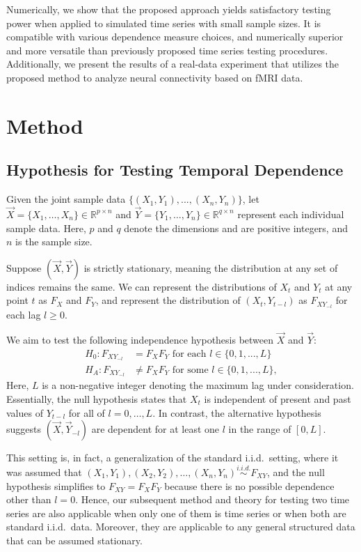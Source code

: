 Numerically, we show that the proposed approach yields satisfactory testing power when applied to simulated time series with small sample sizes. It is compatible with various dependence measure choices, and numerically superior and more versatile than previously proposed time series testing procedures. Additionally, we present the results of a real-data experiment that utilizes the proposed method to analyze neural connectivity based on fMRI data. 

\section{Method}

\subsection{Hypothesis for Testing Temporal Dependence}
Given the joint sample data $\{(X_1,Y_1),...,(X_n,Y_n)\}$, let $\vec{X}=\{X_1, \ldots, X_n\} \in \mathbb{R}^{p \times n}$ and $\vec{Y}=\{Y_1, \ldots, Y_n\} \in \mathbb{R}^{q \times n}$ represent each individual sample data. Here, $p$ and $q$ denote the dimensions and are positive integers, and $n$ is the sample size.

Suppose $(\vec{X},\vec{Y})$ is strictly stationary, meaning the distribution at any set of indices remains the same. We can represent the distributions of $X_t$ and $Y_t$ at any point $t$ as $F_{X}$ and $F_{Y}$, and represent the distribution of $(X_{t}, Y_{t-l})$ as $F_{XY_{-l}}$ for each lag $l \geq 0$.

We aim to test the following independence hypothesis between $\vec{X}$ and $\vec{Y}$:
\begin{align*}
    H_0: F_{XY_{-l}} &= F_{X} F_{Y} \text{ for each } l \in \{0, 1, ..., L\}\\
    H_A: F_{XY_{-l}} &\neq F_{X} F_{Y} \text{ for some } l \in \{0, 1, ..., L\},
\end{align*}
Here, $L$ is a non-negative integer denoting the maximum lag under consideration. Essentially, the null hypothesis states that $X_t$ is independent of present and past values of $Y_{t-l}$ for all of $l=0,\ldots,L$. In contrast, the alternative hypothesis suggests $(\vec{X}, \vec{Y}_{-l})$ are dependent for at least one $l$ in the range of $[0, L]$. 

This setting is, in fact, a generalization of the standard i.i.d.~setting, where it was assumed that $(X_1,Y_1), (X_2, Y_2),\ldots, (X_n, Y_n) \stackrel{i.i.d.}{\sim} F_{XY}$, and the null hypothesis simplifies to $F_{XY} = F_{X} F_{Y}$ because there is no possible dependence other than $l=0$. Hence, our subsequent method and theory for testing two time series are also applicable when only one of them is time series or when both are standard i.i.d.~data. Moreover, they are applicable to any general structured data that can be assumed stationary.

